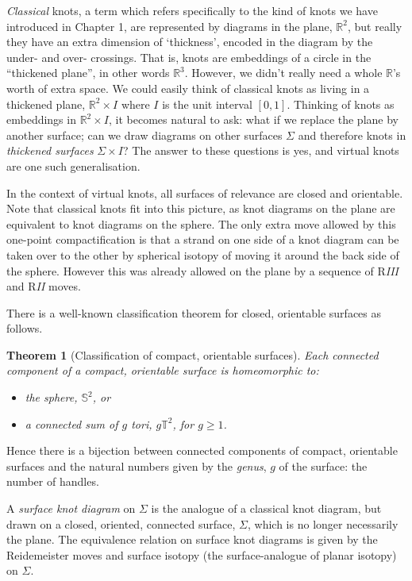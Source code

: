 \documentclass[12pt]{report}
\newcommand{\R}{\mathbb{R}}
\newcommand{\T}{\mathbb{T}}
\renewcommand{\S}{\mathbb{S}}
\newtheorem*{theorem}{Theorem}
\theoremstyle{upright}
\begin{document}
\textit{Classical} knots, a term which refers specifically to the kind of knots we have introduced in Chapter 1, are represented by diagrams in the plane, $\R^{2}$, but really they have an extra dimension of `thickness', encoded in the diagram by the under- and over- crossings. That is, knots are embeddings of a circle in the ``thickened plane'', in other words $\R^{3}$. However, we didn't really need a whole $\R$'s worth of extra space. We could easily think of classical knots as living in a thickened plane, $\R^{2} \times I$ where $I$ is the unit interval $[0, 1]$. Thinking of knots as embeddings in $\R^{2} \times I$, it becomes natural to ask: what if we replace the plane by another surface; can we draw diagrams on other surfaces $\Sigma$ and therefore knots in \textit{thickened surfaces} $\Sigma \times I$? The answer to these questions is yes, and virtual knots are one such generalisation.

In the context of virtual knots, all surfaces of relevance are closed and orientable. Note that classical knots fit into this picture, as knot diagrams on the plane are equivalent to knot diagrams on the sphere. The only extra move allowed by this one-point compactification is that a strand on one side of a knot diagram can be taken over to the other by spherical isotopy of moving it around the back side of the sphere. However this was already allowed on the plane by a sequence of R\textit{III} and R\textit{II} moves.

There is a well-known classification theorem for closed, orientable surfaces as follows.

\begin{theorem}[Classification of compact, orientable surfaces]
Each connected component of a compact, orientable surface is homeomorphic to:
\begin{itemize}
	\item the sphere, $\S^{2}$, or
	\item a connected sum of $g$ tori, $g\T^{2}$, for $g \geq 1$.
\end{itemize}
\end{theorem}
Hence there is a bijection between connected components of compact, orientable surfaces and the natural numbers given by the \textit{genus}, $g$ of the surface: the number of handles.

A \textit{surface knot diagram} on $\Sigma$ is the analogue of a classical knot diagram, but drawn on a closed, oriented, connected surface, $\Sigma$, which is no longer necessarily the plane. The equivalence relation on surface knot diagrams is given by the Reidemeister moves and surface isotopy (the surface-analogue of planar isotopy) on $\Sigma$.
\end{document}
